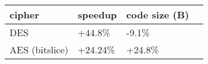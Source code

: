 \centering
  \begin{tabular}{|l K{3cm}|K{3cm}|K{3cm}|}
    \hline
    \textbf{cipher} & \textbf{speedup} & \textbf{code size (B)}\\
    \hline
    DES & +44.8\% & -9.1\% \\
    \hline
    AES (bitslice) & +24.24\% & +24.8\% \\
    \hline
\end{tabular}
